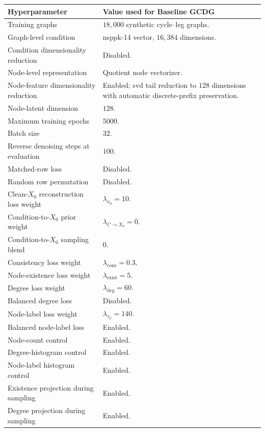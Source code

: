 \begin{table}[p]
\centering
\footnotesize
\begin{tabularx}{\textwidth}{@{}p{}X@{}}
\toprule
Hyperparameter & Value used for Baseline GCDG \\
\midrule
Training graphs & \(18{,}000\) synthetic cycle--leg graphs. \\
Graph-level condition & \gls{nsppk}-14 vector, \(16{,}384\) dimensions. \\
Condition dimensionality reduction & Disabled. \\
Node-level representation & Quotient node vectorizer. \\
Node-feature dimensionality reduction & Enabled; \gls{svd} tail reduction to \(128\) dimensions with automatic discrete-prefix preservation. \\
Node-latent dimension & \(128\). \\
Maximum training epochs & \(5000\). \\
Batch size & \(32\). \\
Reverse denoising steps at evaluation & \(100\). \\
Matched-row loss & Disabled. \\
Random row permutation & Disabled. \\
Clean-\(X_0\) reconstruction loss weight & \(\lambda_{x_0}=10\). \\
Condition-to-\(X_0\) prior weight & \(\lambda_{C\rightarrow X_0}=0\). \\
Condition-to-\(X_0\) sampling blend & \(0\). \\
Consistency loss weight & \(\lambda_{\mathrm{cons}}=0.3\). \\
Node-existence loss weight & \(\lambda_{\mathrm{exist}}=5\). \\
Degree loss weight & \(\lambda_{\mathrm{deg}}=60\). \\
Balanced degree loss & Disabled. \\
Node-label loss weight & \(\lambda_{\tau_V}=140\). \\
Balanced node-label loss & Enabled. \\
Node-count control & Enabled. \\
Degree-histogram control & Enabled. \\
Node-label histogram control & Enabled. \\
Existence projection during sampling & Enabled. \\
Degree projection during sampling & Enabled. \\

\end{tabularx}
\end{table}
